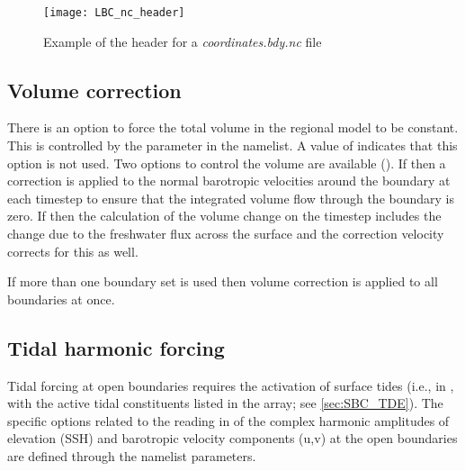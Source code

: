\documentclass[../main/NEMO_manual]{subfiles}
\begin{document}
\begin{figure}[!t]
  \centering
  \texttt{[image: LBC\_nc\_header]}
  \caption[Header for a \textit{coordinates.bdy.nc} file]{
    Example of the header for a \textit{coordinates.bdy.nc} file}
  \label{fig:LBC_nc_header}
\end{figure}

\subsection{Volume correction}
\label{subsec:LBC_bdy_vol_corr}

There is an option to force the total volume in the regional model to be constant.
This is controlled  by the  parameter in the namelist.
A value of  indicates that this option is not used.
Two options to control the volume are available ().
If  then a correction is applied to the normal barotropic velocities around the boundary at
each timestep to ensure that the integrated volume flow through the boundary is zero.
If  then the calculation of the volume change on
the timestep includes the change due to the freshwater flux across the surface and
the correction velocity corrects for this as well.

If more than one boundary set is used then volume correction is
applied to all boundaries at once.

\subsection{Tidal harmonic forcing}
\label{subsec:LBC_bdy_tides}

\begin{listing}
  \caption{}
  \label{lst:nambdy_tide}
\end{listing}

Tidal forcing at open boundaries requires the activation of surface
tides (i.e., in ,  with the active tidal
constituents listed in the  array; see
\autoref{sec:SBC_TDE}). The specific options related to the reading in of
the complex harmonic amplitudes of elevation (SSH) and barotropic
velocity components (u,v) at the open boundaries are defined through the
 namelist parameters.\par
\end{document}
